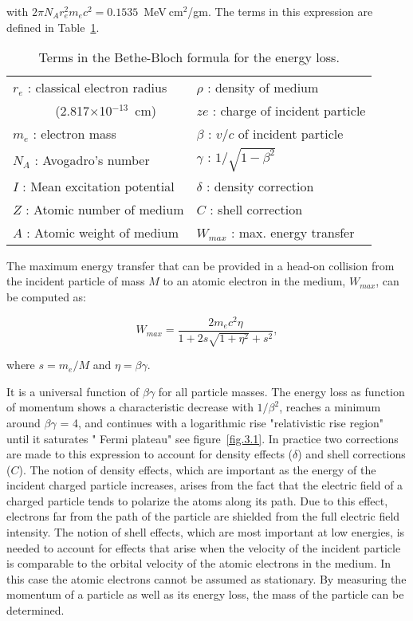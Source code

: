 \noindent
with $2 \pi N_A r_e^2 m_e c^2 = 0.1535$~MeV$~\!$cm$^2$/gm. The terms in this expression are defined in Table~\ref{tab.3.1}.

\begin{table}[htbp]
    \begin{center}
        \begin{tabular} {||l||l||} \hline
            $r_e$ : classical electron radius   & $\rho$ : density of medium \\
            ~~~~~~ (2.817$\times$10$^{-13}$~cm) & $ze$ : charge of incident particle \\
            $m_e$ : electron mass               & $\beta$ : $v/c$ of incident particle \\
            $N_A$ : Avogadro's number           & $\gamma$ : $1/\sqrt{1 - \beta^2}$ \\
            $I$  : Mean excitation potential    & $\delta$ : density correction \\
            $Z$ : Atomic number of medium       & $C$ : shell correction \\
            $A$ : Atomic weight of medium       & $W_{max}$ : max. energy transfer \\ \hline
        \end{tabular}
    \end{center}
    \caption{\small{Terms in the Bethe-Bloch formula for the energy loss.}}
    \label{tab.3.1}
\end{table}

The maximum energy transfer that can be provided in a head-on collision from the incident particle of mass $M$ to an atomic electron in the medium, $W_{max}$, can be computed as:

\begin{equation}
    \label{eq.3.2}
    W_{max} = \frac{2 m_e c^2 \eta}{1 + 2 s \sqrt{1 + \eta^2} + s^2},
\end{equation}

\noindent
where $s = m_e/M$ and $\eta = \beta \gamma$.

It is a universal function of $\beta \gamma$ for all particle masses. The energy loss as function of momentum shows a characteristic decrease with $1/\beta^{2}$, reaches a minimum around $\beta \gamma$ = 4, and continues with a logarithmic rise "relativistic rise region" until it saturates " Fermi plateau" see figure~\ref{fig.3.1}. In practice two corrections are made to this expression to account for density effects ($\delta$) and shell corrections ($C$).  The notion of density effects, which are important as the energy of the incident charged particle increases, arises from the fact that the electric field of a charged particle tends to polarize the atoms along its path.  Due to this effect, electrons far from the path of the particle are shielded from the full electric field intensity. The notion of shell effects, which are most important at low energies, is needed to account for effects that arise when the velocity of the incident particle is comparable to the orbital velocity of the atomic electrons in the medium. In this case the atomic electrons cannot be assumed as stationary. By measuring the momentum of a particle as well as its energy loss, the mass of the particle can be determined.

